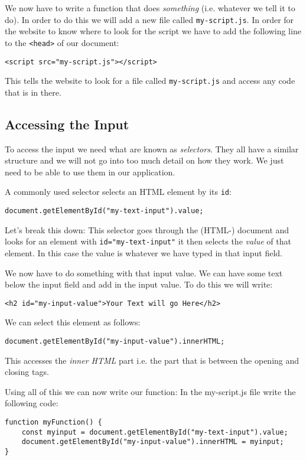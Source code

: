 \documentclass[11pt,a4paper]{report}
\begin{document}
We now have to write a function that does \emph{something} (i.e. whatever we tell it to do). In order to do this we will add a new file called \verb|my-script.js|.  In order for the website to know where to look for the script we have to add the following line to the \verb|<head>| of our document:
\begin{verbatim}
<script src="my-script.js"></script>
\end{verbatim}
This tells the website to look for a file called \verb|my-script.js| and access any code that is in there.

\subsection{Accessing the Input}

To access the input we need what are known as \emph{selectors}. They all have a similar structure and we will not go into too much detail on how they work. We just need to be able to use them in our application.

A commonly used selector selects an HTML element by its \verb|id|: 
\begin{verbatim}
document.getElementById("my-text-input").value;
\end{verbatim}
Let's break this down: This selector goes through the (HTML-) document and looks for an element with \verb|id="my-text-input"| it then selects the \emph{value} of that element. In this case the value is whatever we have typed in that input field.

We now have to do something with that input value. We can have some text below the input field and  add in the input value. To do this we will write:
\begin{verbatim}
<h2 id="my-input-value">Your Text will go Here</h2>
\end{verbatim}
We can select this element as follows:
\begin{verbatim}
document.getElementById("my-input-value").innerHTML;
\end{verbatim}
This accesses the \emph{inner HTML} part i.e. the part that is between the opening and closing tags.

Using all of this we can now write our function: In the my-script.js file write the following code:
\begin{verbatim}
function myFunction() {
    const myinput = document.getElementById("my-text-input").value;
    document.getElementById("my-input-value").innerHTML = myinput;
}
\end{verbatim}
\end{document}
